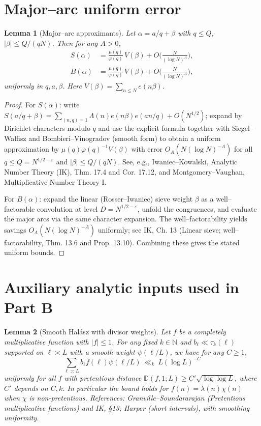 \documentclass[11pt]{article}
\newtheorem{lemma}{Lemma}[part]
\theoremstyle{definition}
\theoremstyle{remark}
\numberwithin{equation}{part}
\begin{document}
\section{Major--arc uniform error}

\begin{lemma}[Major--arc approximants]\label{lem:major-errors}
	Let $\alpha=a/q+\beta$ with $q\le Q$, $|\beta|\le Q/(qN)$. Then for any $A>0$,
	\begin{align*}
		S(\alpha) & =\frac{\mu(q)}{\varphi(q)}\,V(\beta)+O\!\Big(\frac{N}{(\log N)^A}\Big), \\
		B(\alpha) & =\frac{\mu(q)}{\varphi(q)}\,V(\beta)+O\!\Big(\frac{N}{(\log N)^A}\Big),
	\end{align*}
	uniformly in $q,a,\beta$. Here $V(\beta)=\sum_{n\le N}e(n\beta)$.
\end{lemma}

\begin{proof}
	For $S(\alpha)$: write $S(a/q+\beta)=\sum_{(n,q)=1}\Lambda(n)e(n\beta)e(an/q)+O(N^{1/2})$; expand by Dirichlet characters modulo $q$ and use the explicit formula together with Siegel--Walfisz and Bombieri--Vinogradov (smooth form) to obtain a uniform approximation by $\mu(q)\varphi(q)^{-1}V(\beta)$ with error $O_A(N(\log N)^{-A})$ for all $q\le Q=N^{1/2-\varepsilon}$ and $|\beta|\le Q/(qN)$. See, e.g., Iwaniec--Kowalski, Analytic Number Theory (IK), Thm. 17.4 and Cor. 17.12, and Montgomery--Vaughan, Multiplicative Number Theory I.

	For $B(\alpha)$: expand the linear (Rosser--Iwaniec) sieve weight $\beta$ as a well--factorable convolution at level $D=N^{1/2-\varepsilon}$, unfold the congruences, and evaluate the major arcs via the same character expansion. The well--factorability yields savings $O_A(N(\log N)^{-A})$ uniformly; see IK, Ch. 13 (Linear sieve; well--factorability, Thm. 13.6 and Prop. 13.10). Combining these gives the stated uniform bounds.
\end{proof}

\section{Auxiliary analytic inputs used in Part B}

\begin{lemma}[Smooth Hal\'asz with divisor weights]\label{lem:halasz-smooth}
	Let $f$ be a completely multiplicative function with $|f|\le 1$. For any fixed $k\in\mathbb N$ and $b_\ell\ll \tau_k(\ell)$ supported on $\ell\asymp L$ with a smooth weight $\psi(\ell/L)$, we have for any $C\ge 1$,
	\[
		\sum_{\ell\asymp L} b_\ell f(\ell)\psi(\ell/L)\ \ll_{k}\ L(\log L)^{-C}
	\]
	uniformly for all $f$ with pretentious distance $\mathbb D(f,1;L)\ge C'\sqrt{\log\log L}$, where $C'$ depends on $C,k$. In particular the bound holds for $f(n)=\lambda(n)\chi(n)$ when $\chi$ is non-pretentious. References: Granville--Soundararajan (Pretentious multiplicative functions) and IK, §13; Harper (short intervals), with smoothing uniformity.
\end{lemma}
\end{document}
